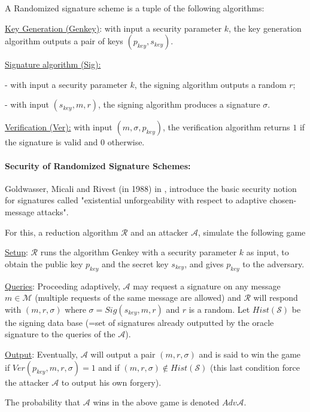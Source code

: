 \documentclass[a4paper,11pt]{article}
\begin{document}
A Randomized signature scheme is a tuple of the following algorithms:

\underline{Key Generation (Genkey)}: with input a security parameter $k$, the key generation algorithm outputs a pair of keys $(p_{key}, s_{key})$.


\underline{Signature algorithm (Sig):}

- with input a security parameter $k$, the signing algorithm outputs a random $r$;

- with input $(s_{key}, m,r)$, the signing algorithm  produces a signature $\sigma$.

\underline{Verification (Ver):}  with input $(m, \sigma, p_{key})$, the verification algorithm returns $1$ if the signature is valid and $0$ otherwise.


\paragraph{Security of Randomized Signature Schemes:}

Goldwasser, Micali and Rivest (in 1988)  in \cite{Goldwasser}, introduce the basic security notion for signatures called "existential unforgeability with respect to adaptive chosen-message attacks".

For this, a reduction algorithm $\mathcal{R}$ and an attacker $\mathcal{A}$, simulate the following game

\underline{Setup}: $\mathcal{R}$ runs the algorithm Genkey with a security parameter $k$ as input, to obtain the public key $p_{key}$ and the secret key $s_{key}$, and gives $p_{key}$ to the adversary.

\underline{Queries}: Proceeding adaptively, $\mathcal{A}$ may request a signature on any message  $m \in  \mathcal{M}$
 (multiple requests of the same message are allowed) and $\mathcal{R}$ will respond with $(m, r,  \sigma)$ where $\sigma= Sig(s_{key}, m, r)$ and $r$ is a random. Let $Hist(\mathcal{S})$ be the signing data base (=set of signatures already outputted by the oracle signature to the queries of the  $\mathcal{A}$).

\underline{Output}: Eventually, $\mathcal{A}$ will output a pair $(m, r,  \sigma)$ and is said to win the game
 if $Ver(p_{key}, m, r, \sigma)=1$ and if $ (m, r,  \sigma) \notin Hist(\mathcal{S})$ (this last condition force the attacker $\mathcal{A}$ to output his own forgery).


The probability that  $\mathcal{A}$ wins in the above game is denoted  $Adv\mathcal{A}$.
\end{document}
